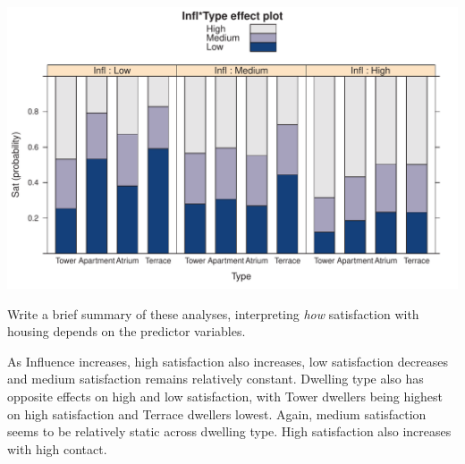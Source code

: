\documentclass[10pt]{report}\usepackage[]{graphicx}\usepackage[]{color}
\newenvironment{knitrout}{}{} %
\renewenvironment{knitrout}{\small\renewcommand{\baselinestretch}{.85}}{} %
\begin{document}
\begin{Exercises}
\begin{enumerate*}
\begin{ans}
\begin{knitrout}
\centerline{\includegraphics[width=.8\textwidth]{soln/fig/ex8_2c5-1} }



\end{knitrout}

    \end{ans}
    
    \item Write a brief summary of these analyses, interpreting \emph{how} satisfaction
    with housing depends on the predictor variables.
    \begin{ans}
    As Influence increases, high satisfaction also increases, low satisfaction decreases and medium satisfaction remains
    relatively constant. Dwelling type also has opposite effects on high and low satisfaction, with Tower
    dwellers being highest on high satisfaction and Terrace dwellers lowest.
    Again, medium satisfaction seems to be relatively static across dwelling type.
    High satisfaction also increases with high contact.
    \end{ans}
    
  \end{enumerate*}


\end{Exercises}
\end{document}

